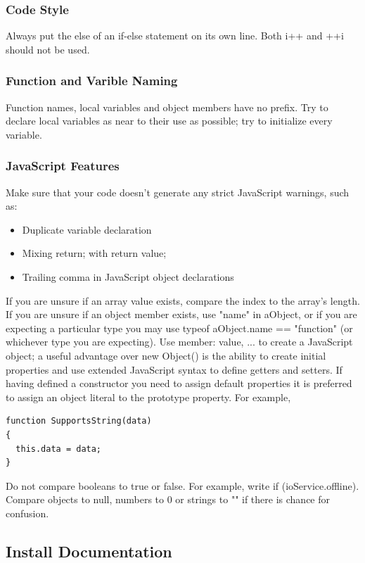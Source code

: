 \documentclass[letterpaper,12pt]{article}
\begin{document}
\subsubsection{Code Style}
Always put the else of an if-else statement on its own line.
Both i++ and ++i should not be used.
\subsubsection{Function and Varible Naming}
Function names, local variables and object members have no prefix.
Try to declare local variables as near to their use as possible; try to initialize every variable.

\subsubsection{JavaScript Features}
Make sure that your code doesn't generate any strict JavaScript warnings, such as:
\begin{itemize}
      	  \item{Duplicate variable declaration}
      	  \item{Mixing return; with return value;}
      	  \item{Trailing comma in JavaScript object declarations}
\end{itemize}    	
If you are unsure if an array value exists, compare the index to the array's length. If you are unsure if an object member exists, use "name" in aObject, or if you are expecting a particular type you may use typeof aObject.name == "function" (or whichever type you are expecting).
Use { member: value, ... } to create a JavaScript object; a useful advantage over new Object() is the ability to create initial properties and use extended JavaScript syntax to define getters and setters.  If having defined a constructor you need to assign default properties it is preferred to assign an object literal to the prototype property. For example,

\begin{verbatim}
function SupportsString(data)
{
  this.data = data;
}
\end{verbatim}
Do not compare booleans to true or false. For example, write if (ioService.offline). Compare objects to null, numbers to 0 or strings to "" if there is chance for confusion.
\subsection{Install Documentation}
\end{document}
